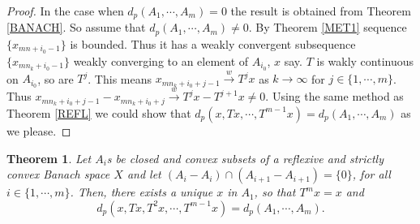 \documentclass{amsart}
\newtheorem{theorem}{Theorem}[section]
\theoremstyle{definition}
\theoremstyle{remark}
\begin{document}
\begin{proof}In the case when $d_p(A_1,\cdots,A_m)=0$ the result is obtained from Theorem \ref{BANACH}. So assume that $d_p(A_1,\cdots,A_m)\neq0$. By Theorem \ref{MET1} sequence $\{x_{mn+i_0-1}\}$ is bounded. Thus it has a weakly convergent subsequence $\{x_{mn_k+i_0-1}\}$ weakly converging to an element of $A_{i_0}$, $x$ say.
$T$ is wakly continuous on $A_{i_0}$, so are $T^j$. This means $x_{mn_k+i_0+j-1}\xrightarrow{w}T^jx$ as $k\to\infty$ for $j\in\{1,\cdots,m\}$. Thus  $x_{mn_k+i_0+j-1}-x_{mn_k+i_0+j}\xrightarrow{w}T^jx-T^{j+1}x\neq0$. Using the same method as Theorem \ref{REFL} we could show that $d_p(x,Tx,\cdots,T^{m-1}x)=d_p(A_1,\cdots,A_m)$ as we please.
\end{proof}
\begin{theorem}\label{REFL5}
 Let $A_i$s be closed and convex subsets of a reflexive and strictly convex Banach space $X$ and let $(A_i-A_i)\cap(A_{i+1}-A_{i+1})=\{0\}$, for all $i\in\{1,\cdots,m\}$. Then, there exists a unique $x$ in $A_1$, so that $T^mx=x$ and $$d_p(x,Tx,T^2x,\cdots,T^{m-1}x)=d_p(A_1,\cdots,A_{m}).$$
\end{theorem}
\end{document}
